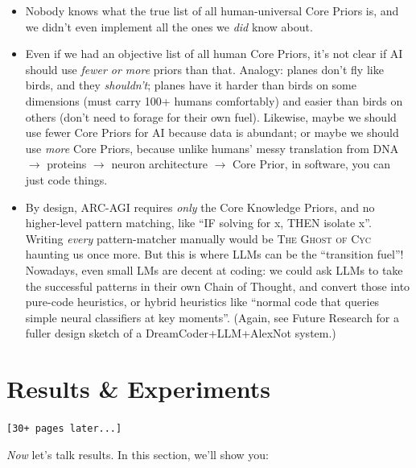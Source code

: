 \documentclass[11pt]{article}
\begin{document}
\begin{itemize}
    \item Nobody knows what the true list of all human-universal Core Priors is, and we didn't even implement all the ones we \textit{did} know about.
    \item Even if we had an objective list of all human Core Priors, it's not clear if AI should use \textit{fewer or more} priors than that. Analogy: planes don't fly like birds, and they \textit{shouldn't}; planes have it harder than birds on some dimensions (must carry 100+ humans comfortably) and easier than birds on others (don't need to forage for their own fuel). Likewise, maybe we should use fewer Core Priors for AI because data is abundant; or maybe we should use \textit{more} Core Priors, because unlike humans' messy translation from DNA $\to$ proteins $\to$ neuron architecture $\to$ Core Prior, in software, you can just code things.
    \item By design, ARC-AGI requires \textit{only} the Core Knowledge Priors, and no higher-level pattern matching, like ``IF solving for x, THEN isolate x''. Writing \textit{every} pattern-matcher manually would be \textsc{The Ghost of Cyc} haunting us once more. But this is where LLMs can be the ``transition fuel''! Nowadays, even small LMs are decent at coding: we could ask LLMs to take the successful patterns in their own Chain of Thought, and convert those into pure-code heuristics, or hybrid heuristics like ``normal code that queries simple neural classifiers at key moments''. (Again, see Future Research for a fuller design sketch of a DreamCoder+LLM+AlexNot system.)
\end{itemize}





\section{Results \& Experiments}\label{sec:results}

\texttt{[30+ pages later...]}

\textit{Now} let's talk results. In this section, we'll show you:
\end{document}
